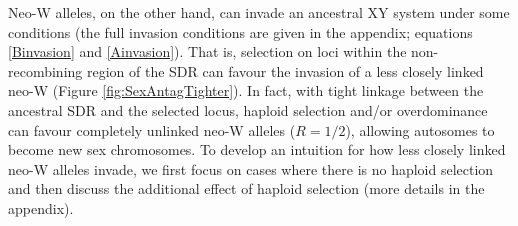 \documentclass[12pt]{article}
\begin{document}
Neo-W alleles, on the other hand, can invade an ancestral XY system under some conditions (the full invasion conditions are given in the appendix; equations \ref{Binvasion} and \ref{Ainvasion}). 
That is, selection on loci within the non-recombining region of the SDR can favour the invasion of a less closely linked neo-W (Figure \ref{fig:SexAntagTighter}). 
In fact, with tight linkage between the ancestral SDR and the selected locus, haploid selection and/or overdominance can favour completely unlinked neo-W alleles ($R=1/2$), allowing autosomes to become new sex chromosomes.
To develop an intuition for how less closely linked neo-W alleles invade, we first focus on cases where there is no haploid selection and then discuss the additional effect of haploid selection (more details in the appendix). 
\end{document}
